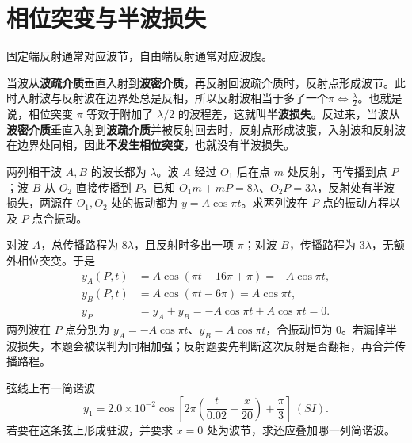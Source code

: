 
\section{相位突变与半波损失}
\begin{note}
固定端反射通常对应波节，自由端反射通常对应波腹。
\end{note}
\begin{definition}
当波从\textbf{波疏介质}垂直入射到\textbf{波密介质}，再反射回波疏介质时，反射点形成波节。此时入射波与反射波在边界处总是反相，所以反射波相当于多了一个\(\pi \iff \frac{\lambda}{2}\)。也就是说，相位突变 \(\pi\) 等效于附加了 \(\lambda/2\) 的波程差，这就叫\textbf{半波损失}。反过来，当波从\textbf{波密介质}垂直入射到\textbf{波疏介质}并被反射回去时，反射点形成波腹，入射波和反射波在边界处同相，因此\textbf{不发生相位突变}，也就没有半波损失。
\end{definition}

\begin{exercise}[反射后再与另一列波相遇时怎样先记半波损失]
两列相干波 \(A,B\) 的波长都为 \(\lambda\)。波 \(A\) 经过 \(O_1\) 后在点 \(m\) 处反射，再传播到点 \(P\)；波 \(B\) 从 \(O_2\) 直接传播到 \(P\)。已知 \(O_1m+mP=8\lambda\)、\(O_2P=3\lambda\)，反射处有半波损失，两源在 \(O_1,O_2\) 处的振动都为 \(y=A\cos \pi t\)。求两列波在 \(P\) 点的振动方程以及 \(P\) 点合振动。
\end{exercise}
\begin{solution}
对波 \(A\)，总传播路程为 \(8\lambda\)，且反射时多出一项 \(\pi\)；对波 \(B\)，传播路程为 \(3\lambda\)，无额外相位突变。于是
\[
\begin{aligned}
y_A(P,t)&=A\cos(\pi t-16\pi+\pi)=-A\cos\pi t,\\
y_B(P,t)&=A\cos(\pi t-6\pi)=A\cos\pi t,\\
y_P&=y_A+y_B=-A\cos\pi t+A\cos\pi t=0.
\end{aligned}
\]
两列波在 \(P\) 点分别为 \(y_A=-A\cos\pi t\)、\(y_B=A\cos\pi t\)，合振动恒为 \(0\)。若漏掉半波损失，本题会被误判为同相加强；反射题要先判断这次反射是否翻相，再合并传播路程。
\end{solution}

\begin{exercise}[已知一列行波时怎样补出形成驻波的反向波]
弦线上有一简谐波
\[
y_1=2.0\times10^{-2}\cos\!\left[2\pi\left(\frac{t}{0.02}-\frac{x}{20}\right)+\frac{\pi}{3}\right]\ (\si{SI}).
\]
若要在这条弦上形成驻波，并要求 \(x=0\) 处为波节，求还应叠加哪一列简谐波。
\end{exercise}

